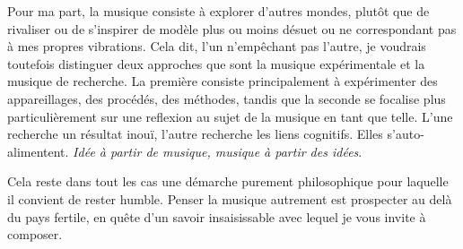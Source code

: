 \documentclass{article}
\newcommand{\footref}[1]{%
  \enotezwritemark{\enmarkstyle\ref{#1}}%
}
\begin{document}
Pour ma part, la musique consiste à explorer d'autres mondes, plutôt que de rivaliser ou de s'inspirer de modèle plus ou moins désuet ou ne correspondant pas à mes propres vibrations. Cela dit, l'un n'empêchant pas l'autre, je voudrais toutefois distinguer deux approches que sont la musique expérimentale et la musique de recherche. La première consiste principalement à expérimenter des appareillages, des procédés, des méthodes, tandis que la seconde se focalise plus particulièrement sur une reflexion au sujet de la musique en tant que telle. L'une recherche un résultat inouï, l'autre recherche les liens cognitifs. Elles s'auto-alimentent. \textit{Idée à partir de musique, musique à partir des idées}.

Cela reste dans tout les cas une démarche purement philosophique pour laquelle il convient de rester humble. Penser la musique autrement est prospecter au delà du pays fertile, en quête d’un savoir insaisissable avec lequel je vous invite à composer. 







\end{document}
